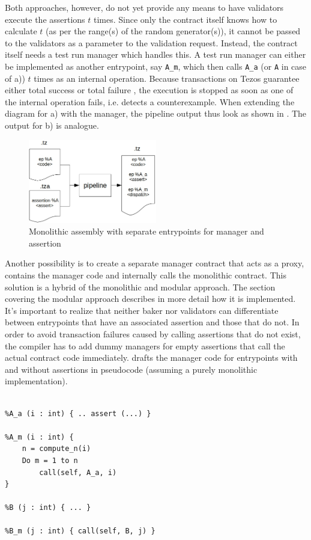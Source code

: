 Both approaches, however, do not yet provide any means to have validators execute the assertions $t$ times. Since only the contract itself knows how to calculate $t$ (as per the range(s) of the random generator(s)), it cannot be passed to the validators as a parameter to the validation request. Instead, the contract itself needs a test run manager which handles this. A test run manager can either be implemented as another entrypoint, say \texttt{A\_m}, which then calls \texttt{A\_a} (or \texttt{A} in case of a)) $t$ times as an internal operation. Because transactions on Tezos guarantee either total success or total failure \cite{tezos_docs}, the execution is stopped as soon as one of the internal operation fails, i.e. detects a counterexample. When extending the diagram for a) with the manager, the pipeline output thus look as shown in . The output for b) is analogue.
\begin{figure}[h]
\centering
  \includegraphics[width=0.5\textwidth]{figures/4-offline_tezos/pipeline_output_mono_ep.jpg}
	\caption{Monolithic assembly with separate entrypoints for manager and assertion}
	\label{fig:monolithic_orchestration}
\end{figure}
Another possibility is to create a separate manager contract that acts as a proxy, contains the manager code and internally calls the monolithic contract. This solution is a hybrid of the monolithic and modular approach. The section covering the modular approach describes in more detail how it is implemented.\\
It's important to realize that neither baker nor validators can differentiate between entrypoints that have an associated assertion and those that do not. In order to avoid transaction failures caused by calling assertions that do not exist, the compiler has to add dummy managers for empty assertions that call the actual contract code immediately.  drafts the manager code for entrypoints with and without assertions in pseudocode (assuming a purely monolithic implementation). 
\begin{lstlisting}[label=lst:manager, caption=Implementation of the manager in pseudocode]
%A (i : int) { ... }

%A_a (i : int) { .. assert (...) }

%A_m (i : int) {
	n = compute_n(i)
	Do m = 1 to n
		call(self, A_a, i)
}

%B (j : int) { ... }

%B_m (j : int) { call(self, B, j) }
\end{lstlisting}

